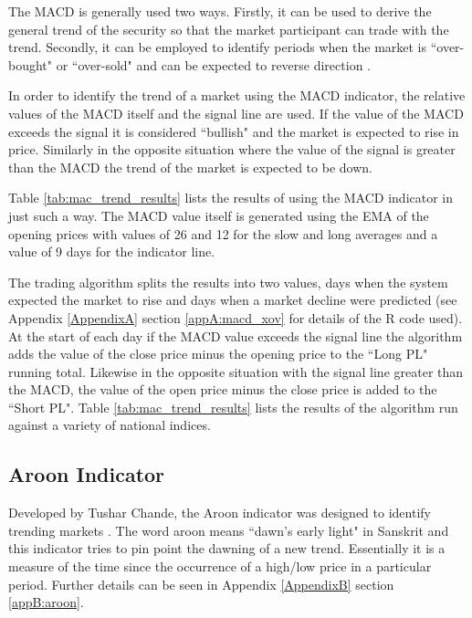 The MACD is generally used two ways. Firstly, it can be used to derive the general trend of the security so that the market participant can trade with the trend. Secondly, it can be employed to identify periods when the market is \textquotedblleft over-bought" or \textquotedblleft over-sold" and can be expected to reverse direction \citep{person2012}.

In order to identify the trend of a market using the MACD indicator, the relative values of the MACD itself and the signal line are used. If the value of the MACD exceeds the signal it is considered \textquotedblleft bullish" and the market is expected to rise in price. Similarly in the opposite situation where the value of the signal is greater than the MACD the trend of the market is expected to be down. 

Table \ref{tab:mac_trend_results} lists the results of using the MACD indicator in just such a way. The MACD value itself is generated using the EMA of the opening prices with values of 26 and 12 for the slow and long averages and a value of 9 days for the indicator line. 

The trading algorithm splits the results into two values, days when the system expected the market to rise and days when a market decline were predicted (see Appendix \ref{AppendixA} section \ref{appA:macd_xov} for details of the R code used). At the start of each day if the MACD value exceeds the signal line the algorithm adds the value of the close price minus the opening price to the \textquotedblleft Long PL" running total. Likewise in the opposite situation with the signal line greater than the MACD, the value of the open price minus the close price is added to the \textquotedblleft Short PL". Table \ref{tab:mac_trend_results} lists the results of the algorithm run against a variety of national indices.




\subsection{Aroon Indicator}
Developed by Tushar Chande, the Aroon indicator was designed to identify trending markets \citep{chande1994new}. The word aroon means \textquotedblleft dawn's early light" in Sanskrit and this indicator tries to pin point the dawning of a new trend.  Essentially it is a measure of the time since the occurrence of a high/low price in a particular period. Further details can be seen in Appendix \ref{AppendixB} section \ref{appB:aroon}.

